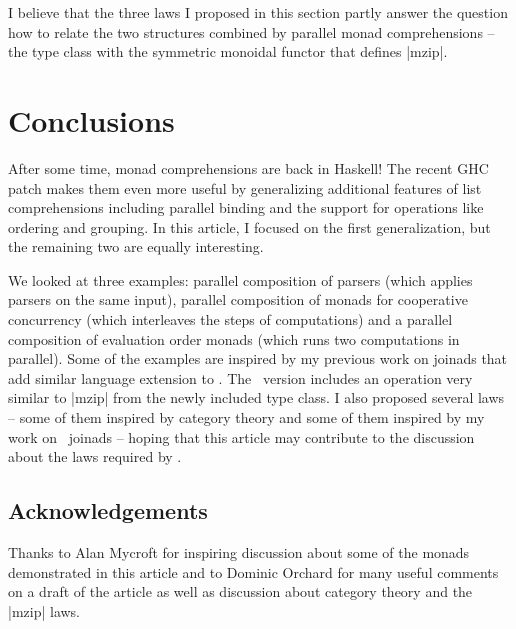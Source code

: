 \documentclass{tmr}
\begin{document}
I believe that the three laws I proposed in this section partly answer the question how to relate
the two structures combined by parallel monad comprehensions -- the  type class
with the symmetric monoidal functor that defines |mzip|.


\section{Conclusions}
After some time, monad comprehensions are back in Haskell! The recent GHC patch makes them even 
more useful by generalizing additional features of list comprehensions including parallel binding 
and the support for operations like ordering and grouping. In this article, I focused on the first 
generalization, but the remaining two are equally interesting.

We looked at three examples: parallel composition of parsers (which applies 
parsers on the same input), parallel composition of monads for cooperative concurrency (which interleaves
the steps of computations) and a parallel composition of evaluation order monads (which runs two 
computations in parallel). Some of the examples are inspired by my previous work on joinads that add 
similar language extension to \fsharp. The \fsharp \ version includes an operation very similar to 
|mzip| from the newly included  type class. I also proposed several laws -- some of 
them inspired by category theory and some of them inspired by my work on \fsharp \ joinads -- hoping 
that this article may contribute to the discussion about the laws required by .

\subsection{Acknowledgements}
Thanks to Alan Mycroft for inspiring discussion about some of the monads demonstrated in this article
and to Dominic Orchard for many useful comments on a draft of the article as well as discussion
about category theory and the |mzip| laws.


\end{document}
